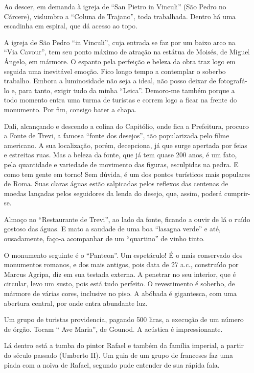 Ao descer, em demanda à igreja de ``San Pietro in Vinculi'' (São Pedro no Cárcere), vislumbro a ``Coluna de Trajano'', toda trabalhada. Dentro há uma escadinha em espiral, que dá acesso ao topo.

A igreja de São Pedro ``in Vinculi'', cuja entrada se faz por um baixo arco na ``Via Cavour'', tem seu ponto máximo de atração na estátua de Moisés, de Miguel Ângelo, em mármore. O espanto pela perfeição e beleza da obra traz logo em seguida uma inevitável emoção. Fico longo tempo a contemplar o soberbo trabalho. Embora a luminosidade não seja a ideal, não posso deixar de fotografá-lo e, para tanto, exigir tudo da minha ``Leica''. Demoro-me também porque a todo momento entra uma turma de turistas e correm logo a ficar na frente do monumento. Por fim, consigo bater a chapa.

Dali, alcançando e descendo a colina do Capitólio, onde fica a Prefeitura, procuro a Fonte de Trevi, a famosa ``fonte dos desejos'', tão popularizada pelo filme americano. A sua localização, porém, decepciona, já que surge apertada por feias e estreitas ruas. Mas a beleza da fonte, que já tem quase 200 anos, é um fato, pela quantidade e variedade de movimento das figuras, esculpidas na pedra. E como tem gente em torno! Sem dúvida, é um dos pontos turísticos mais populares de Roma. Suas claras águas estão salpicadas pelos reflexos das centenas de moedas lançadas pelos seguidores da lenda do desejo, que, assim, poderá cumprir-se.

Almoço no ``Restaurante de Trevi'', ao lado da fonte, ficando a ouvir de lá o ruído gostoso das águas. E mato a saudade de uma boa ``lasagna verde'' e até, ousadamente, faço-a acompanhar de um ``quartino'' de vinho tinto.

O monumento seguinte é o ``Panteon''. Um espetáculo! É o mais conservado dos monumentos romanos, e dos mais antigos, pois data de 27 a.c., construído por Marcus Agripa, diz em sua testada externa. A penetrar no seu interior, que é circular, levo um susto, pois está tudo perfeito. O revestimento é soberbo, de mármore de várias cores, inclusive no piso. A abóbada é gigantesca, com uma abertura central, por onde entra abundante luz.

Um grupo de turistas providencia, pagando 500 liras, a execução de um número de órgão. Tocam `` Ave Maria'', de Gounod. A acústica é impressionante.

Lá dentro está a tumba do pintor Rafael e também da família imperial, a partir do século passado (Umberto II). Um guia de um grupo de franceses faz uma piada com a noiva de Rafael, segundo pude entender de sua rápida fala.

